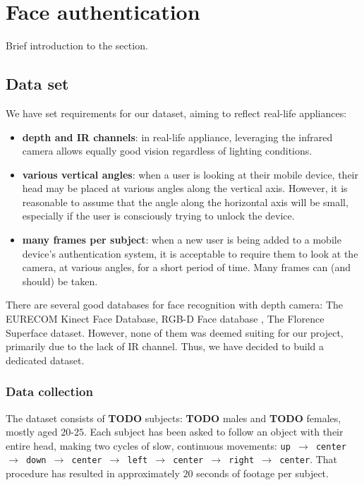 \section{Face authentication}
    Brief introduction to the section.

    \subsection{Data set}
    We have set requirements for our dataset, aiming to reflect real-life
    appliances:
    \begin{itemize}
        \item \textbf{depth and IR channels}: in real-life appliance, leveraging
        the infrared camera allows equally good vision regardless of lighting
        conditions.
        \item \textbf{various vertical angles}: when a user is looking at their
        mobile device,
        their head may be placed at various angles along the vertical axis.
        However, it is reasonable to assume that the angle along the horizontal
        axis will be small, especially if the user is consciously trying to
        unlock the device.
        \item \textbf{many frames per subject}: when a new user is being added
        to a mobile device's authentication system, it is acceptable to require
        them to look at the camera, at various angles, for a short period of
        time. Many frames can (and should) be taken.
    \end{itemize}

    There are several good databases for face recognition with depth camera:
    The EURECOM Kinect Face Database\cite{eurecom},
    RGB-D Face database \cite{vapaaudk},
    The Florence Superface dataset\cite{superface}. However, none of them was
    deemed suiting for our project, primarily due to the lack of IR channel.
    Thus, we have decided to build a dedicated dataset.

    \subsubsection*{Data collection}
    The dataset consists of \textbf{TODO} subjects: \textbf{TODO} males and
    \textbf{TODO} females, mostly aged $20$-$25$. Each subject has been asked to
    follow an object with their entire head, making two cycles of slow,
    continuous movements: \texttt{up $\to$ center $\to$ down $\to$ center $\to$
    left $\to$ center $\to$ right $\to$ center}.
    That procedure has resulted in approximately $20$ seconds of footage per
    subject.


